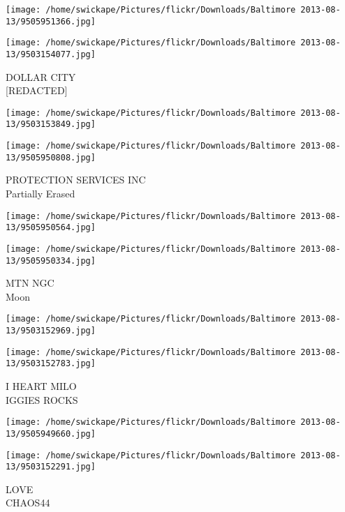 \documentclass[10pt,letterpaper]{article}
\begin{document}
\texttt{[image: /home/swickape/Pictures/flickr/Downloads/Baltimore 2013-08-13/9505951366.jpg]}

\vspace{0.25in}
\texttt{[image: /home/swickape/Pictures/flickr/Downloads/Baltimore 2013-08-13/9503154077.jpg]}

DOLLAR CITY\\
{[}REDACTED{]}\\
\pagebreak

\texttt{[image: /home/swickape/Pictures/flickr/Downloads/Baltimore 2013-08-13/9503153849.jpg]}

\vspace{0.25in}
\texttt{[image: /home/swickape/Pictures/flickr/Downloads/Baltimore 2013-08-13/9505950808.jpg]}

PROTECTION SERVICES INC\\
Partially Erased\\
\pagebreak

\texttt{[image: /home/swickape/Pictures/flickr/Downloads/Baltimore 2013-08-13/9505950564.jpg]}

\vspace{0.25in}
\texttt{[image: /home/swickape/Pictures/flickr/Downloads/Baltimore 2013-08-13/9505950334.jpg]}

MTN NGC\\
Moon\\
\pagebreak

\texttt{[image: /home/swickape/Pictures/flickr/Downloads/Baltimore 2013-08-13/9503152969.jpg]}

\vspace{0.25in}
\texttt{[image: /home/swickape/Pictures/flickr/Downloads/Baltimore 2013-08-13/9503152783.jpg]}

I HEART MILO\\
IGGIES ROCKS\\
\pagebreak

\texttt{[image: /home/swickape/Pictures/flickr/Downloads/Baltimore 2013-08-13/9505949660.jpg]}

\vspace{0.25in}
\texttt{[image: /home/swickape/Pictures/flickr/Downloads/Baltimore 2013-08-13/9503152291.jpg]}

LOVE\\
CHAOS44\\
\pagebreak
\end{document}

